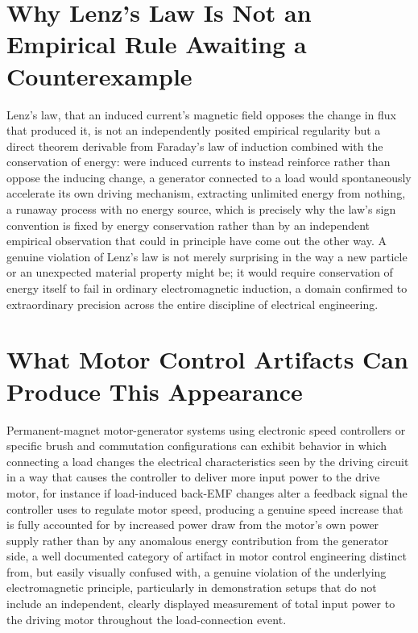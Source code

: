 \documentclass[11pt]{article}
\begin{document}
\section{Why Lenz's Law Is Not an Empirical Rule Awaiting a Counterexample}

Lenz's law, that an induced current's magnetic field opposes the change in flux that produced it, is not an independently posited empirical regularity but a direct theorem derivable from Faraday's law of induction combined with the conservation of energy: were induced currents to instead reinforce rather than oppose the inducing change, a generator connected to a load would spontaneously accelerate its own driving mechanism, extracting unlimited energy from nothing, a runaway process with no energy source, which is precisely why the law's sign convention is fixed by energy conservation rather than by an independent empirical observation that could in principle have come out the other way. A genuine violation of Lenz's law is not merely surprising in the way a new particle or an unexpected material property might be; it would require conservation of energy itself to fail in ordinary electromagnetic induction, a domain confirmed to extraordinary precision across the entire discipline of electrical engineering.

\section{What Motor Control Artifacts Can Produce This Appearance}

Permanent-magnet motor-generator systems using electronic speed controllers or specific brush and commutation configurations can exhibit behavior in which connecting a load changes the electrical characteristics seen by the driving circuit in a way that causes the controller to deliver more input power to the drive motor, for instance if load-induced back-EMF changes alter a feedback signal the controller uses to regulate motor speed, producing a genuine speed increase that is fully accounted for by increased power draw from the motor's own power supply rather than by any anomalous energy contribution from the generator side, a well documented category of artifact in motor control engineering distinct from, but easily visually confused with, a genuine violation of the underlying electromagnetic principle, particularly in demonstration setups that do not include an independent, clearly displayed measurement of total input power to the driving motor throughout the load-connection event.
\end{document}

